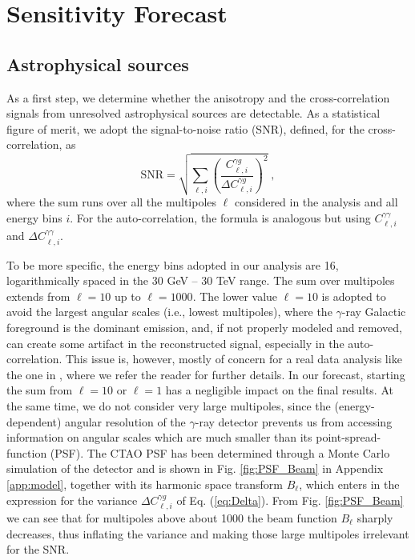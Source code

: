 \section{Sensitivity Forecast}\label{sec:sens}


\subsection{Astrophysical sources}

As a first step, we determine whether the anisotropy and the cross-correlation signals from unresolved astrophysical sources are detectable. As a statistical figure of merit, we adopt the signal-to-noise ratio (SNR), defined, for the cross-correlation, as
\begin{equation}
    \textrm{SNR} = \sqrt{\sum_{\ell, i} \left(\frac{C_{\ell, i}^{\gamma g}}{\varDelta C_{\ell, i}^{\gamma g}}\right)^2}\;,
    \label{eq:SNR2}
\end{equation}
%
where the sum runs over all the multipoles $\ell$ considered in the analysis and all energy bins $i$. For the auto-correlation, the formula is analogous but using $C_{\ell, i}^{{\gamma \gamma}}$ and $\varDelta C_{\ell,i}^{\gamma \gamma}$.

To be more specific, the energy bins adopted in our analysis are 16, logarithmically spaced in the 30 GeV – 30 TeV range.
The sum over multipoles extends from $\ell = 10$ up to $\ell = 1000$. The lower value $\ell = 10$ is adopted to avoid the largest angular scales (i.e., lowest multipoles),
where the $\gamma$-ray Galactic foreground is the dominant emission, and, if not properly modeled and removed, can create some artifact in the reconstructed signal, especially in the auto-correlation. This issue is, however, mostly of concern for a real data analysis like the one in \cite{Fermi-LAT:2018udj}, where we refer the reader for further details. In our forecast, starting the sum from $\ell=10$ or $\ell=1$ has a negligible impact on the final results.
At the same time, we do not consider very large multipoles, since the (energy-dependent) angular resolution of the $\gamma$-ray detector prevents us from accessing information on angular scales which are much smaller than its point-spread-function (PSF). The CTAO PSF has been determined through a Monte Carlo simulation of the detector and is shown in Fig. \ref{fig:PSF_Beam} in Appendix \ref{app:model}, together with its harmonic space transform $B_\ell$, which enters in the expression for the variance $\varDelta C_{\ell, i}^{\gamma g}$ of Eq. (\ref{eq:Delta}). From Fig. \ref{fig:PSF_Beam} we can see that for multipoles above about 1000 the beam function $B_\ell$ sharply decreases, thus inflating the variance and making those large multipoles irrelevant for the SNR.

